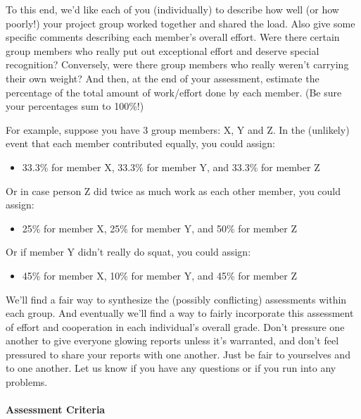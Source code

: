 \documentclass[]{article}
\providecommand{\tightlist}{%
  \setlength{\itemsep}{0pt}\setlength{\parskip}{0pt}}
\let\oldparagraph\paragraph
\renewcommand{\paragraph}[1]{\oldparagraph{#1}\mbox{}}
\begin{document}
To this end, we'd like each of you (individually) to describe how well
(or how poorly!) your project group worked together and shared the load.
Also give some specific comments describing each member's overall
effort. Were there certain group members who really put out exceptional
effort and deserve special recognition? Conversely, were there group
members who really weren't carrying their own weight? And then, at the
end of your assessment, estimate the percentage of the total amount of
work/effort done by each member. (Be sure your percentages sum to
100\%!)

For example, suppose you have 3 group members: X, Y and Z. In the
(unlikely) event that each member contributed equally, you could assign:

\begin{itemize}
\tightlist
\item
  33.3\% for member X, 33.3\% for member Y, and 33.3\% for member Z
\end{itemize}

Or in case person Z did twice as much work as each other member, you
could assign:

\begin{itemize}
\tightlist
\item
  25\% for member X, 25\% for member Y, and 50\% for member Z
\end{itemize}

Or if member Y didn't really do squat, you could assign:

\begin{itemize}
\tightlist
\item
  45\% for member X, 10\% for member Y, and 45\% for member Z
\end{itemize}

We'll find a fair way to synthesize the (possibly conflicting)
assessments within each group. And eventually we'll find a way to fairly
incorporate this assessment of effort and cooperation in each
individual's overall grade. Don't pressure one another to give everyone
glowing reports unless it's warranted, and don't feel pressured to share
your reports with one another. Just be fair to yourselves and to one
another. Let us know if you have any questions or if you run into any
problems.

\paragraph{Assessment Criteria}\label{assessment-criteria}
\end{document}
